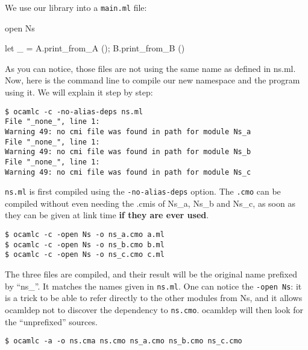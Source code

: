 \documentclass[11pt,a4paper]{article}
\begin{document}
We use our library into a \texttt{main.ml} file:

\begin{OCaml}
open Ns

let _ = 
  A.print_from_A ();
  B.print_from_B ()
\end{OCaml}

As you can notice, those files are not using the same name as defined in
ns.ml. Now, here is the command line to compile our new namespace and the
program using it. We will explain it step by step:


\begin{verbatim}
$ ocamlc -c -no-alias-deps ns.ml
File "_none_", line 1:
Warning 49: no cmi file was found in path for module Ns_a
File "_none_", line 1:
Warning 49: no cmi file was found in path for module Ns_b
File "_none_", line 1:
Warning 49: no cmi file was found in path for module Ns_c
\end{verbatim}

\texttt{ns.ml} is first compiled using the \texttt{-no-alias-deps} option. The
\texttt{.cmo} can be compiled without even needing the .cmis of Ns\_a, Ns\_b and
Ns\_c, as soon as they can be given at link time \textbf{if they are ever
  used}.

\begin{verbatim}
$ ocamlc -c -open Ns -o ns_a.cmo a.ml
$ ocamlc -c -open Ns -o ns_b.cmo b.ml
$ ocamlc -c -open Ns -o ns_c.cmo c.ml
\end{verbatim}

The three files are compiled, and their result will be the original name
prefixed by ``ns\_''. It matches the names given in \texttt{ns.ml}. One can
notice the \texttt{-open Ns}: it is a trick to be able to refer directly to the
other modules from Ns, and it allows ocamldep not to discover the dependency to
\texttt{ns.cmo}. ocamldep will then look for the ``unprefixed'' sources. 

\begin{verbatim}
$ ocamlc -a -o ns.cma ns.cmo ns_a.cmo ns_b.cmo ns_c.cmo
\end{verbatim}
\end{document}
